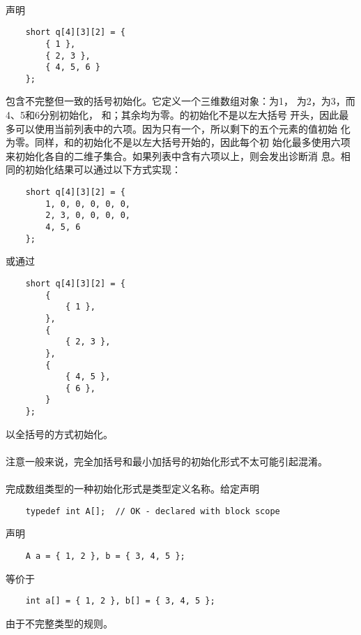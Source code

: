 {\paragraph{}
\ex 声明
\begin{lstlisting}
    short q[4][3][2] = {
        { 1 },
        { 2, 3 },
        { 4, 5, 6 }
    };
\end{lstlisting}
包含不完整但一致的括号初始化。它定义一个三维数组对象：为1，
为2，为3，而4、5和6分别初始化，
和；其余均为零。的初始化不是以左大括号
开头，因此最多可以使用当前列表中的六项。因为只有一个，所以剩下的五个元素的值初始
化为零。同样，和的初始化不是以左大括号开始的，因此每个初
始化最多使用六项来初始化各自的二维子集合。如果列表中含有六项以上，则会发出诊断消
息。相同的初始化结果可以通过以下方式实现：
\begin{lstlisting}
    short q[4][3][2] = {
        1, 0, 0, 0, 0, 0,
        2, 3, 0, 0, 0, 0,
        4, 5, 6
    };
\end{lstlisting}
或通过
\begin{lstlisting}
    short q[4][3][2] = {
        {
            { 1 },
        },
        {
            { 2, 3 },
        },
        {
            { 4, 5 },
            { 6 },
        }
    };
\end{lstlisting}
以全括号的方式初始化。

\paragraph{}
注意一般来说，完全加括号和最小加括号的初始化形式不太可能引起混淆。

\paragraph{}
\ex 完成数组类型的一种初始化形式是类型定义名称。给定声明
\begin{lstlisting}
    typedef int A[];  // OK - declared with block scope
\end{lstlisting}
声明
\begin{lstlisting}
    A a = { 1, 2 }, b = { 3, 4, 5 };
\end{lstlisting}
等价于
\begin{lstlisting}
    int a[] = { 1, 2 }, b[] = { 3, 4, 5 };
\end{lstlisting}
由于不完整类型的规则。

}
